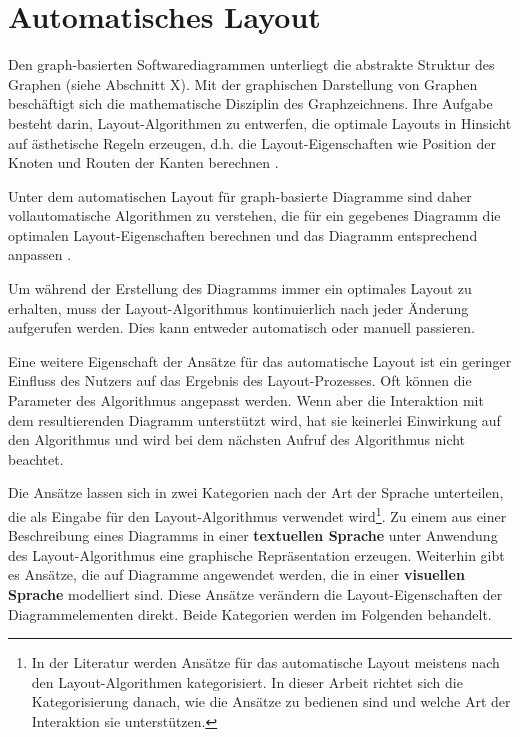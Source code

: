 
\section{Automatisches Layout}
\label{sec:automatic-layout}

Den graph-basierten Softwarediagrammen unterliegt die abstrakte Struktur des Graphen (siehe Abschnitt X). Mit der graphischen Darstellung von Graphen beschäftigt sich die mathematische Disziplin des Graphzeichnens. Ihre Aufgabe besteht darin, Layout-Algorithmen zu entwerfen, die optimale Layouts in Hinsicht auf ästhetische Regeln erzeugen, d.h. die Layout-Eigenschaften wie Position der Knoten und Routen der Kanten berechnen \cite{Eichelberger05Aesthetics, Arvo02Techniques, Siebenhaller03Automatisches, Maier12A-Pattern-based}.

Unter dem automatischen Layout für graph-basierte Diagramme sind daher vollautomatische Algorithmen zu verstehen, die für ein gegebenes Diagramm die optimalen Layout-Eigenschaften berechnen und das Diagramm entsprechend anpassen \cite{Fuhrmann11On-the-Pragmatics}.

Um während der Erstellung des Diagramms immer ein optimales Layout zu erhalten, muss der Layout-Algorithmus kontinuierlich nach jeder Änderung aufgerufen werden. Dies kann entweder automatisch oder manuell passieren.

Eine weitere Eigenschaft der Ansätze für das automatische Layout ist ein geringer Einfluss des Nutzers auf das Ergebnis des Layout-Prozesses. Oft können die Parameter des Algorithmus angepasst werden. Wenn aber die Interaktion mit dem resultierenden Diagramm unterstützt wird, hat sie keinerlei Einwirkung auf den Algorithmus und wird bei dem nächsten Aufruf des Algorithmus nicht beachtet.

Die Ansätze lassen sich in zwei Kategorien nach der Art der Sprache unterteilen, die als Eingabe für den Layout-Algorithmus verwendet wird\footnote{In der Literatur werden Ansätze für das automatische Layout meistens nach den Layout-Algorithmen kategorisiert. In dieser Arbeit richtet sich die Kategorisierung danach, wie die Ansätze zu bedienen sind und welche Art der Interaktion sie unterstützen.}. Zu einem aus einer Beschreibung eines Diagramms in einer \textbf{textuellen Sprache} unter Anwendung des Layout-Algorithmus eine graphische Repräsentation erzeugen. Weiterhin gibt es Ansätze, die auf Diagramme angewendet werden, die in einer \textbf{visuellen Sprache} modelliert sind. Diese Ansätze verändern die Layout-Eigenschaften der Diagrammelementen direkt. Beide Kategorien werden im Folgenden behandelt.

